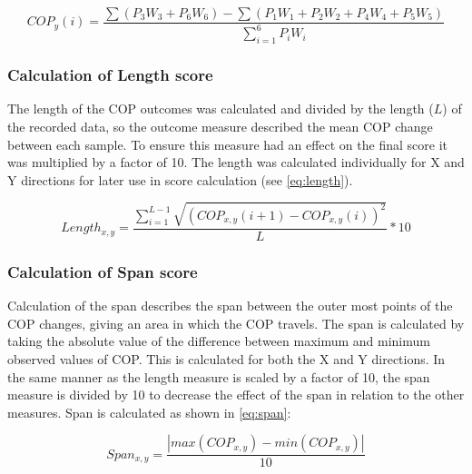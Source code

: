 \begin{equation} \label{eq:COPy}
COP_y(i) =  \frac{\sum(P_3 W_3 + P_6 W_6) - \sum(P_1 W_1+P_2 W_2+P_4 W_4+P_5 W_5)}{\sum_{i=1}^{6}P_i W_i}
\end{equation} 



\subsubsection{Calculation of Length score}
The length of the COP outcomes was calculated and divided by the length ($L$) of the recorded data, so the outcome measure described the mean COP change between each sample. To ensure this measure had an effect on the final score it was multiplied by a factor of 10. The length was calculated individually for X and Y directions for later use in score calculation (see \eqref{eq:length}).

\begin{equation} \label{eq:length}
Length_{x,y} = \frac{\sum_{i=1}^{L-1}\sqrt{(COP_{x,y} (i+1)-COP_{x,y} (i))^2}}{L} * 10
\end{equation}


\subsubsection{Calculation of Span score}
Calculation of the span describes the span between the outer most points of the COP changes, giving an area in which the COP travels. 
The span is calculated by taking the absolute value of the difference between maximum and minimum observed values of COP. This is calculated for both the X and Y directions. In the same manner as the length measure is scaled by a factor of 10, the span measure is divided by 10 to decrease the effect of the span in relation to the other measures. Span is calculated as shown in \eqref{eq:span}:

\begin{equation} \label{eq:span}
Span_{x,y} = \frac{\left| max(COP_{x,y})-min(COP_{x,y})\right|}{10}
\end{equation}



